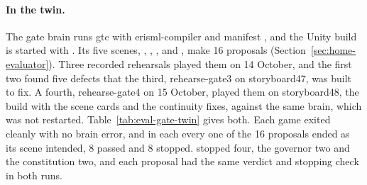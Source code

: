 \paragraph{In the twin.} The gate brain runs gtc  with erisml-compiler
 and manifest , and the Unity build is started with . Its
five scenes, , , ,  and ,
make 16 proposals (Section~\ref{sec:home-evaluator}). Three recorded rehearsals played them on 14
October, and the first two found five defects that the third, rehearse-gate3 on storyboard47, was
built to fix. A fourth, rehearse-gate4 on 15 October, played them on storyboard48, the build with
the scene cards and the continuity fixes, against the same brain, which was not restarted.
Table~\ref{tab:eval-gate-twin} gives both. Each game exited cleanly with no brain error, and in
each every one of the 16 proposals ended as its scene intended, 8 passed and 8 stopped. \deme{}
stopped four, the governor two and the constitution two, and each proposal had the same verdict
and stopping check in both runs.

